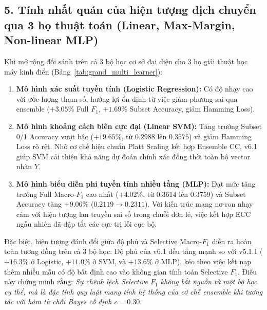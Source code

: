 \documentclass[11pt,a4paper]{article}
\begin{document}
\subsection{5. Tính nhất quán của hiện tượng dịch chuyển qua 3 họ thuật toán (Linear, Max-Margin, Non-linear MLP)}
Khi mở rộng đối sánh trên cả 3 bộ học cơ sở đại diện cho 3 họ giải thuật học máy kinh điển (Bảng~\ref{tab:grand_multi_learner}):
\begin{enumerate}
    \item \textbf{Mô hình xác suất tuyến tính (Logistic Regression):} Có độ nhạy cao với ước lượng tham số, hưởng lợi ổn định từ việc giảm phương sai qua ensemble ($+3.05\%$ Full $F_1$, $+1.69\%$ Subset Accuracy, giảm Hamming Loss).
    \item \textbf{Mô hình khoảng cách biên cực đại (Linear SVM):} Tăng trưởng Subset 0/1 Accuracy vượt bậc ($+19.65\%$, từ $0.2988$ lên $0.3575$) và giảm Hamming Loss rõ rệt. Nhờ cơ chế hiệu chuẩn Platt Scaling kết hợp Ensemble CC, v6.1 giúp SVM cải thiện khả năng dự đoán chính xác đồng thời toàn bộ vector nhãn $Y$.
    \item \textbf{Mô hình biểu diễn phi tuyến tính nhiều tầng (MLP):} Đạt mức tăng trưởng Full Macro-$F_1$ cao nhất ($+4.02\%$, từ $0.3614$ lên $0.3759$) và Subset Accuracy tăng $+9.06\%$ ($0.2119 \to 0.2311$). Với kiến trúc mạng nơ-ron nhạy cảm với hiện tượng lan truyền sai số trong chuỗi đơn lẻ, việc kết hợp ECC ngẫu nhiên đã dập tắt các cực trị lỗi cục bộ.
\end{enumerate}
Đặc biệt, hiện tượng đánh đổi giữa độ phủ và Selective Macro-$F_1$ diễn ra hoàn toàn tương đồng trên cả 3 bộ học: Độ phủ của v6.1 đều tăng mạnh so với v5.1.1 ($+16.3\%$ ở Logistic, $+11.0\%$ ở SVM, và $+13.6\%$ ở MLP), kéo theo việc kết nạp thêm nhiều mẫu có độ bất định cao vào không gian tính toán Selective $F_1$. Điều này chứng minh rằng: \textit{Sự chênh lệch Selective $F_1$ không bắt nguồn từ một bộ học cụ thể, mà là đặc tính quy luật mang tính hệ thống của cơ chế ensemble khi tương tác với hàm từ chối Bayes cố định $c = 0.30$}.
\end{document}
